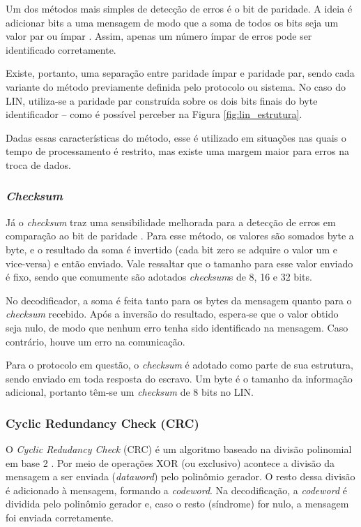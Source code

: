 Um dos métodos mais simples de detecção de erros é o bit de paridade. A ideia é adicionar bits a uma mensagem de modo que a soma de todos os bits seja um valor par ou ímpar \cite{rahmani2007error}. Assim, apenas um número ímpar de erros pode ser identificado corretamente.

Existe, portanto, uma separação entre paridade ímpar e paridade par, sendo cada variante do método previamente definida pelo protocolo ou sistema. No caso do LIN, utiliza-se a paridade par \cite{ti2018lin} construída sobre os dois bits finais do byte identificador -- como é possível perceber na Figura \ref{fig:lin_estrutura}.

Dadas essas características do método, esse é utilizado em situações nas quais o tempo de processamento é restrito, mas existe uma margem maior para erros na troca de dados.

\subsubsection{\textit{Checksum}}
Já o \textit{checksum} traz uma sensibilidade melhorada para a detecção de erros em comparação ao bit de paridade \cite{rahmani2007error}. Para esse método, os valores são somados byte a byte, e o resultado da soma é invertido (cada bit zero se adquire o valor um e vice-versa) e então enviado. Vale ressaltar que o tamanho para esse valor enviado é fixo, sendo que comumente são adotados \textit{checksum}s de 8, 16 e 32 bits.

No decodificador, a soma é feita tanto para os bytes da mensagem quanto para o \textit{checksum} recebido. Após a inversão do resultado, espera-se que o valor obtido seja nulo, de modo que nenhum erro tenha sido identificado na mensagem. Caso contrário, houve um erro na comunicação.

Para o protocolo em questão, o \textit{checksum} é adotado como parte de sua estrutura, sendo enviado em toda resposta do escravo. Um byte é o tamanho da informação adicional, portanto têm-se um \textit{checksum} de 8 bits no LIN.

\subsubsection{Cyclic Redundancy Check (CRC)}

O \textit{Cyclic Redudancy Check} (CRC) é um algoritmo baseado na divisão polinomial em base 2 \cite{errors1995crcchecksum}. Por meio de operações XOR (ou exclusivo) acontece a divisão da mensagem a ser enviada (\textit{dataword}) pelo polinômio gerador. O resto dessa divisão é adicionado à mensagem, formando a \textit{codeword}. Na decodificação, a \textit{codeword} é dividida pelo polinômio gerador e, caso o resto (síndrome) for nulo, a mensagem foi enviada corretamente.

